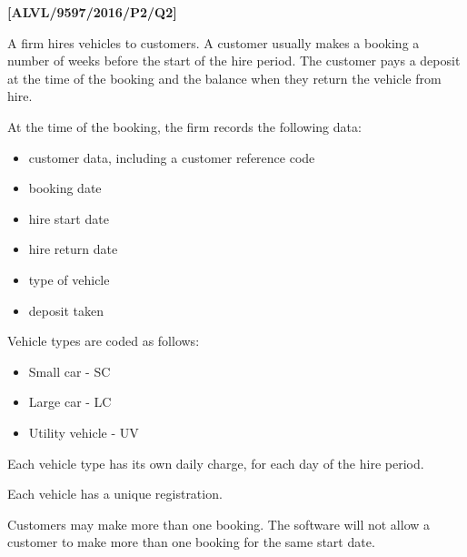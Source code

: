 \item \textbf{{[}ALVL/9597/2016/P2/Q2{]} }

A firm hires vehicles to customers. A customer usually makes a booking
a number of weeks before the start of the hire period. The customer
pays a deposit at the time of the booking and the balance when they
return the vehicle from hire.

At the time of the booking, the firm records the following data:
\begin{itemize}
\item customer data, including a customer reference code
\item booking date
\item hire start date
\item hire return date
\item type of vehicle
\item deposit taken
\end{itemize}
Vehicle types are coded as follows:
\begin{itemize}
\item Small car - SC
\item Large car - LC
\item Utility vehicle - UV
\end{itemize}
Each vehicle type has its own daily charge, for each day of the hire
period.

Each vehicle has a unique registration.

Customers may make more than one booking. The software will not allow
a customer to make more than one booking for the same start date.


